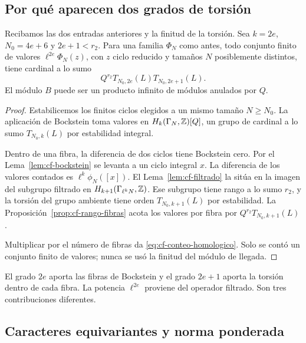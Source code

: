 \subsection{Por qué aparecen dos grados de torsión}

\begin{proposicion}
\label{prop:cf-conteo-homologico}
Recibamos las dos entradas anteriores y la finitud de la torsión.
Sea $k=2e$, $N_0=4e+6$ y $2e+1<r_2$. Para una familia
$\Phi_N$ como antes, todo conjunto finito de valores
$\ell^{2e}\Phi_N(z)$, con $z$ ciclo reducido y tamaños $N$
posiblemente distintos, tiene cardinal a lo sumo
\begin{equation}
 Q^{r_2}T_{N_0,2e}(L)T_{N_0,2e+1}(L).
 \label{eq:cf-conteo-homologico}
\end{equation}
El módulo $B$ puede ser un producto infinito de módulos anulados
por $Q$.
\end{proposicion}

\begin{proof}
Estabilicemos los finitos ciclos elegidos a un mismo tamaño
$N\ge N_0$. La aplicación de Bockstein toma valores en
$H_k(\Gamma_N,\mathbb{Z})[Q]$, un grupo de cardinal a lo sumo
$T_{N_0,k}(L)$ por estabilidad integral.

Dentro de una fibra, la diferencia de dos ciclos tiene Bockstein
cero. Por el Lema~\ref{lem:cf-bockstein} se levanta a un ciclo
integral $x$. La diferencia de los valores contados es
$\ell^k\phi_N([x])$. El Lema~\ref{lem:cf-filtrado} la sitúa
en la imagen del subgrupo filtrado en
$H_{k+1}(\Gamma_{\ell^kN},\mathbb{Z})$.
Ese subgrupo tiene rango a lo sumo $r_2$, y la torsión del grupo
ambiente tiene orden $T_{N_0,k+1}(L)$ por estabilidad.
La Proposición~\ref{prop:cf-rango-fibras} acota los valores por
fibra por $Q^{r_2}T_{N_0,k+1}(L)$.

Multiplicar por el número de fibras da
\eqref{eq:cf-conteo-homologico}. Solo se contó un conjunto finito
de valores; nunca se usó la finitud del módulo de llegada.
\end{proof}

El grado $2e$ aporta las fibras de Bockstein y el grado $2e+1$
aporta la torsión dentro de cada fibra. La potencia $\ell^{2e}$
proviene del operador filtrado. Son tres contribuciones diferentes.

\subsection{Caracteres equivariantes y norma ponderada}

